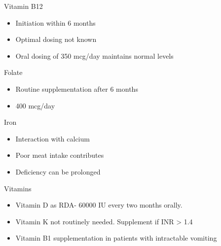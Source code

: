 \documentclass[11pt]{beamer}
\begin{document}
 \begin{frame}{Vitamin B12  }
  \begin{itemize}
  
  \item Initiation within 6 months
  \item Optimal dosing not known
  \item Oral dosing of 350 mcg/day maintains normal levels
  	
  \end{itemize}
 \end{frame} 
 \begin{frame}{Folate  }
 \begin{itemize}
 
 \item Routine supplementation after 6 months
 \item 400 mcg/day
 	
 \end{itemize}
 \end{frame}
 \begin{frame}{ Iron }
 \begin{itemize}
 
 \item Interaction with calcium
 \item Poor meat intake contributes
 \item Deficiency can be prolonged
 	
 \end{itemize}
 \end{frame} 
 \begin{frame}{ Vitamins }
 \begin{itemize}
 
 \item Vitamin D as RDA- 60000 IU every two months orally.
 \item Vitamin K not routinely needed. Supplement if INR > 1.4
 \item Vitamin B1 supplementation in patients with intractable vomiting
 	
 \end{itemize}
 \end{frame} 
\end{document}
